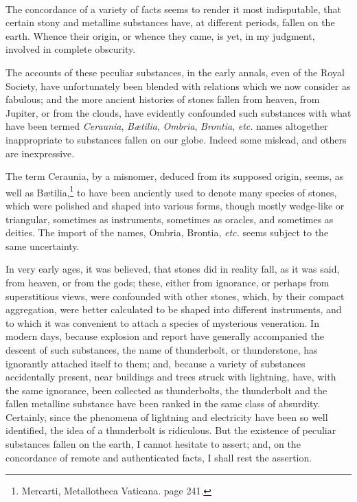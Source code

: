 \documentclass[a4paper, 12pt, oneside, twocolumn]{article}
\begin{document}
\paragraph{}
The concordance of a variety of facts seems to render it most indisputable, that certain stony and metalline substances have, at different periods, fallen on the earth. Whence their origin, or whence they came, is yet, in my judgment, involved in complete obscurity.

The accounts of these peculiar substances, in the early annals, even of the Royal Society, have unfortunately been blended with relations which we now consider as fabulous; and the more ancient histories of stones fallen from heaven, from Jupiter, or from the clouds, have evidently confounded such substances with what have been termed \emph{Ceraunia}, \emph{Bætilia}, \emph{Ombria}, \emph{Brontia}, \emph{etc.} names altogether inappropriate to substances fallen on our globe. Indeed some mislead, and others are inexpressive.

The term Ceraunia, by a misnomer, deduced from its supposed origin, seems, as well as Bætilia,\footnote{Mercarti, Metallotheca Vaticana. page 241.} to have been anciently used to denote many species of stones, which were polished and shaped into various forms, though mostly wedge-like or triangular, sometimes as instruments, sometimes as oracles, and sometimes as deities. The import of the names, Ombria, Brontia, \emph{etc.} seems subject to the same uncertainty.

In very early ages, it was believed, that stones did in reality fall, as it was said, from heaven, or from the gods; these, either from ignorance, or perhaps from superstitious views, were confounded with other stones, which, by their compact aggregation, were better calculated to be shaped into different instruments, and to which it was convenient to attach a species of mysterious veneration. In modern days, because explosion and report have generally accompanied the descent of such substances, the name of thunderbolt, or thunderstone, has ignorantly attached itself to them; and, because a variety of substances accidentally present, near buildings and trees struck with lightning, have, with the same ignorance, been collected as thunderbolts, the thunderbolt and the fallen metalline substance have been ranked in the same class of absurdity. Certainly, since the phenomena of lightning and electricity have been so well identified, the idea of a thunderbolt is ridiculous. But the existence of peculiar substances fallen on the earth, I cannot hesitate to assert; and, on the concordance of remote and authenticated facts, I shall rest the assertion.
\end{document}
